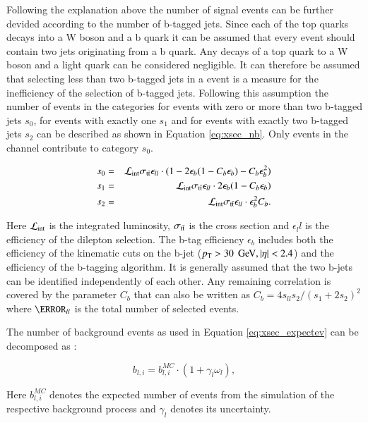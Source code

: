 Following the explanation above the number of signal events can be further devided according to the number of b-tagged jets.
Since each of the top quarks decays into a W boson and a b quark it can be assumed that every \ttbar event should contain two jets originating from a b quark.
Any decays of a top quark to a W boson and a light quark can be considered negligible.
It can therefore be assumed that selecting less than two b-tagged jets in a \ttbar event is a measure for the inefficiency of the selection of b-tagged jets.
Following this assumption the number of events in the categories for events with zero or more than two b-tagged jets $s_0$, for events with exactly one $s_1$ and for events with exactly two b-tagged jets $s_2$ can be described as shown in Equation \ref{eq:xsec_nb}. Only events in the \emu channel contribute to category $s_0$.

\begin{eqnarray}
s_0  &=& \mathcal{L}_{\rm int}\sigma_\mathrm{t\bar{t}} \epsilon_{ll} \cdot (1-2\epsilon_b(1-C_b\epsilon_b)-C_b\epsilon_b^2) \\
s_1  &=& \mathcal{L}_{\rm int} \sigma_\mathrm{t\bar{t}} \epsilon_{ll} \cdot 2 \epsilon_b(1-C_b\epsilon_b) \\
s_2  &=& \mathcal{L}_{\rm int} \sigma_\mathrm{t\bar{t}} \epsilon_{ll} \cdot   \epsilon_b^2 C_b 
\label{eq:xsec_nb}.
\end{eqnarray}

Here $\mathcal{L}_{\rm int}$ is the integrated luminosity, $\sigma_\mathrm{t\bar{t}}$ is the \ttbar cross section and $\epsilon_ll$ is the efficiency of the dilepton selection.
The b-tag efficiency $\epsilon_b$ includes both the efficiency of the kinematic cuts on the b-jet ($p_{\mathrm{T}} > 30\; \,\text{Ge\hspace{-.08em}V}, |\eta|<2.4$) and the efficiency of the b-tagging algorithm.
It is generally assumed that the two b-jets can be identified independently of each other. Any remaining correlation is covered by the parameter $C_b$ that can also be written as
$C_b=4s_{ll}s_2/(s_1+2s_2)^2$ where $\s_{ll}$ is the total number of selected events. 


The number of background events as used in Equation \ref{eq:xsec_expectev} can be decomposed as :

\begin{equation}
b_{l,i} = b_{l,i}^{MC} \cdot (1 + \gamma_l \omega_l),
\label{eq:nbli}
\end{equation}

Here $b_{l,i}^{MC}$ denotes the expected number of events from the simulation of the respective background process and $\gamma_l$ denotes its uncertainty.

